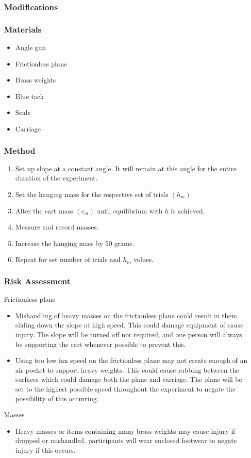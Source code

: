 \documentclass[12pt,a4paper]{article}
\begin{document}
\subsubsection{Modifications}


\subsubsection{Materials}
\begin{itemize}
	\item Angle gun 
	\item Frictionless plane
	\item Brass weights
	\item Blue tack 
	\item Scale
	\item Carriage
\end{itemize}

\subsubsection{Method}
\begin{enumerate}
\item Set up slope at a constant angle. It will remain at this angle for the entire duration of the experiment. 
\item Set the hanging mass for the respective set of trials $(h_m)$. 
\item Alter the cart mass $(c_m)$ until equilibrium with $h$ is achieved.
\item Measure and record masses. 
\item Increase the hanging mass by 50 grams. 
\item Repeat for set number of trials and $h_m$ values.
	
	 
\end{enumerate}


\subsubsection{Risk Assessment}
Frictionless plane
\begin{itemize}
	\item Mishandling of heavy masses on the frictionless plane could result in them sliding down the slope at high speed. This could damage equipment of cause injury. The slope will be turned off not required, and one person will always be supporting the cart whenever possible to prevent this. 
	\item Using too low fan speed on the frictionless plane may not create enough of an air pocket to support heavy weights. This could cause rubbing between the surfaces which could damage both the plane and carriage. The plane will be set to the highest possible speed throughout the experiment to negate the possibility of this occurring.
\end{itemize}
Masses
\begin{itemize}
	\item Heavy masses or items containing many brass weights may cause injury if dropped or mishandled. participants will wear enclosed footwear to negate injury if this occurs.  
\end{itemize}
\end{document}

